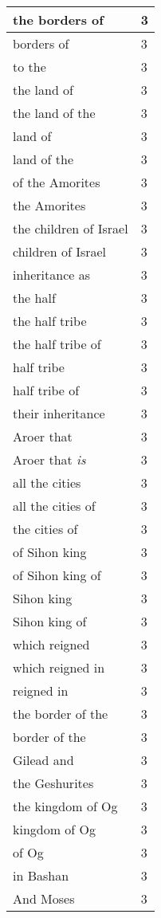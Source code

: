 \begin{center}
\begin{longtable}{|p{3.0in}|p{0.5in}|}
the borders of & 3\\ \hline 
borders of & 3\\ \hline 
to the & 3\\ \hline 
the land of & 3\\ \hline 
the land of the & 3\\ \hline 
land of & 3\\ \hline 
land of the & 3\\ \hline 
of the Amorites & 3\\ \hline 
the Amorites & 3\\ \hline 
the children of Israel & 3\\ \hline 
children of Israel & 3\\ \hline 
inheritance as & 3\\ \hline 
the half & 3\\ \hline 
the half tribe & 3\\ \hline 
the half tribe of & 3\\ \hline 
half tribe & 3\\ \hline 
half tribe of & 3\\ \hline 
their inheritance & 3\\ \hline 
Aroer that & 3\\ \hline 
Aroer that \emph{is} & 3\\ \hline 
all the cities & 3\\ \hline 
all the cities of & 3\\ \hline 
the cities of & 3\\ \hline 
of Sihon king & 3\\ \hline 
of Sihon king of & 3\\ \hline 
Sihon king & 3\\ \hline 
Sihon king of & 3\\ \hline 
which reigned & 3\\ \hline 
which reigned in & 3\\ \hline 
reigned in & 3\\ \hline 
the border of the & 3\\ \hline 
border of the & 3\\ \hline 
Gilead and & 3\\ \hline 
the Geshurites & 3\\ \hline 
the kingdom of Og & 3\\ \hline 
kingdom of Og & 3\\ \hline 
of Og & 3\\ \hline 
in Bashan & 3\\ \hline 
And Moses & 3\\ \hline 

\end{longtable}
\end{center}
